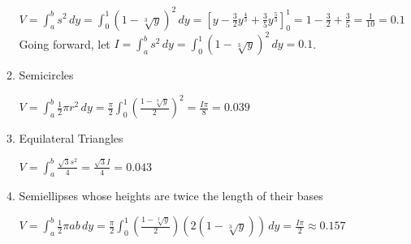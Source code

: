 \documentclass[10pt,letterpaper]{report}
\begin{document}
\begin{enumerate}
\begin{enumerate}
      $V=\int_{a}^{b}{s^{2}}\,dy=\int_{0}^{1}{\left(1-\sqrt[3]{y}\right)^{2}}\,dy=[y-\frac{3}{2}y^{\frac{4}{3}}+\frac{3}{5}y^{\frac{5}{3}}]_{0}^{1}=1-\frac{3}{2}+\frac{3}{5}=\frac{1}{10}=0.1$\\
      
      Going forward, let $I=\int_{a}^{b}{s^{2}}\,dy=\int_{0}^{1}{\left(1-\sqrt[3]{y}\right)^{2}}\,dy=0.1$. \\
      
    \item{Semicircles \\}
    
      $V=\int_{a}^{b}{\frac{1}{2}\pi r^{2}}\,dy=\frac{\pi}{2}\int_{0}^{1}{\left(\frac{1-\sqrt[3]{y}}{2}\right)^{2}}=\frac{I\pi}{8}=0.039$ \\
      
    \item{Equilateral Triangles \\}
    
      $V=\int_{a}^{b}{\frac{\sqrt{3}s^{2}}{4}}=\frac{\sqrt{3}I}{4}=0.043$ \\
      
    \item{Semiellipses whose heights are twice the length of their bases \\}
    
      $V=\int_{a}^{b}{\frac{1}{2}\pi ab}\,dy=\frac{\pi}{2}\int_{0}^{1}{\left(\frac{1-\sqrt[3]{y}}{2}\right)\left(2\left(1-\sqrt[3]{y}\right)\right)}\,dy=\frac{I\pi}{2}\approx 0.157$ \\
      
  \end{enumerate}
\end{enumerate}
\end{document}
